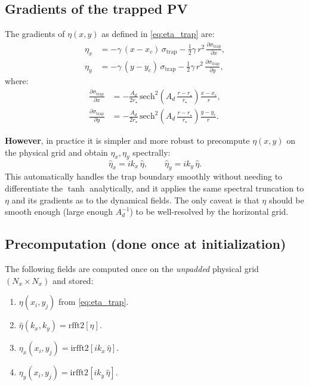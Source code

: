 \documentclass[11pt]{article}
\newcommand{\hhat}[1]{\widehat{#1}}
\begin{document}
\subsection{Gradients of the trapped PV}

The gradients of $\eta(x,y)$ as defined in \eqref{eq:eta_trap} are:
\begin{align}
\eta_x &= -\gamma\,(x-x_c)\,\sigma_{\mathrm{trap}} - \frac{1}{2}\gamma\,r^2\,\frac{\partial\sigma_{\mathrm{trap}}}{\partial x},\label{eq:eta_x_trap}\\
\eta_y &= -\gamma\,(y-y_c)\,\sigma_{\mathrm{trap}} - \frac{1}{2}\gamma\,r^2\,\frac{\partial\sigma_{\mathrm{trap}}}{\partial y},\label{eq:eta_y_trap}
\end{align}
where:
\begin{align}
\frac{\partial\sigma_{\mathrm{trap}}}{\partial x} &= -\frac{A_d}{2r_\star}\,\mathrm{sech}^2\!\left(A_d\,\frac{r - r_\star}{r_\star}\right)\frac{x - x_c}{r},\\
\frac{\partial\sigma_{\mathrm{trap}}}{\partial y} &= -\frac{A_d}{2r_\star}\,\mathrm{sech}^2\!\left(A_d\,\frac{r - r_\star}{r_\star}\right)\frac{y - y_c}{r}.
\end{align}

\textbf{However}, in practice it is simpler and more robust to precompute $\eta(x,y)$ on the physical grid and obtain $\eta_x, \eta_y$ spectrally:
\begin{equation}
\hhat\eta_x = ik_x\,\hhat\eta, \qquad \hhat\eta_y = ik_y\,\hhat\eta.
\label{eq:eta_grad_spectral}
\end{equation}
This automatically handles the trap boundary smoothly without needing to differentiate the $\tanh$ analytically, and it applies the same spectral truncation to $\eta$ and its gradients as to the dynamical fields. The only caveat is that $\eta$ should be smooth enough (large enough $A_d^{-1}$) to be well-resolved by the horizontal grid.

\subsection{Precomputation (done once at initialization)}

The following fields are computed once on the \emph{unpadded} physical grid $(N_x \times N_x)$ and stored:
\begin{enumerate}[nosep]
\item $\eta(x_i, y_j)$ from \eqref{eq:eta_trap}.
\item $\hhat\eta(k_x, k_y) = \mathrm{rfft2}[\eta]$.
\item $\eta_x(x_i, y_j) = \mathrm{irfft2}[ik_x\,\hhat\eta]$.
\item $\eta_y(x_i, y_j) = \mathrm{irfft2}[ik_y\,\hhat\eta]$.
\end{enumerate}
\end{document}
